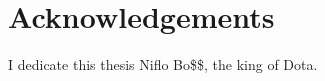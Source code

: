 \chapter*{Acknowledgements}
\thispagestyle{empty}

I dedicate this thesis Niflo Bo\$\$, the king of Dota.

